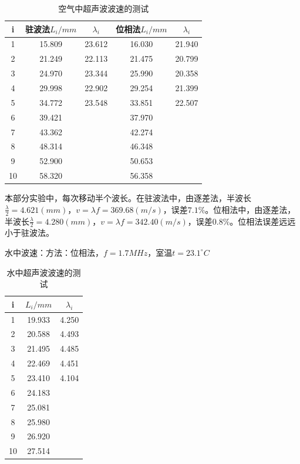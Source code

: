 \documentclass[11pt]{article}
\begin{document}
\begin{table}[H]
    \centering
    \caption{空气中超声波波速的测试}
    \begin{tabular}{|c|c|c|c|c|}
    \hline
        i & 驻波法$L_i/mm$ & $\lambda_i$ & 位相法$L_i/mm$ & $\lambda_i$ \\ \hline
        1 & 15.809  & 23.612  & 16.030  & 21.940  \\ \hline
        2 & 21.249  & 22.113  & 21.475  & 20.799  \\ \hline
        3 & 24.970  & 23.344  & 25.990  & 20.358  \\ \hline
        4 & 29.998  & 22.902  & 29.254  & 21.399  \\ \hline
        5 & 34.772  & 23.548  & 33.851  & 22.507  \\ \hline
        6 & 39.421  & ~ & 37.970  & ~ \\ \hline
        7 & 43.362  & ~ & 42.274  & ~ \\ \hline
        8 & 48.314  & ~ & 46.348  & ~ \\ \hline
        9 & 52.900  & ~ & 50.653  & ~ \\ \hline
        10 & 58.320  & ~ & 56.358 & ~ \\ \hline
    \end{tabular}
\end{table}

\par 本部分实验中，每次移动半个波长。在驻波法中，由逐差法，半波长$\frac{\lambda}{2}=4.621(mm)$，$v=\lambda f=369.68(m/s)$，误差$7.1\%$。位相法中，由逐差法，半波长$\frac{\lambda}{2}=4.280(mm)$，$v=\lambda f=342.40(m/s)$，误差$0.8\%$。位相法误差远远小于驻波法。
\par \noindent 水中波速：\quad 方法：位相法，\qquad$f=1.7MHz$，\qquad 室温$t=23.1^\circ C$
\begin{table}[H]
    \centering
    \caption{水中超声波波速的测试}
    \begin{tabular}{|c|c|c|}
    \hline
        i & $L_i/mm$ & $\lambda_i$ \\ \hline
        1 & 19.933  & 4.250  \\ \hline
        2 & 20.588  & 4.493  \\ \hline
        3 & 21.495  & 4.485  \\ \hline
        4 & 22.469  & 4.451  \\ \hline
        5 & 23.410  & 4.104  \\ \hline
        6 & 24.183  & ~ \\ \hline
        7 & 25.081  & ~ \\ \hline
        8 & 25.980  & ~ \\ \hline
        9 & 26.920  & ~ \\ \hline
        10 & 27.514 & ~ \\ \hline
    \end{tabular}
\end{table}
\end{document}
